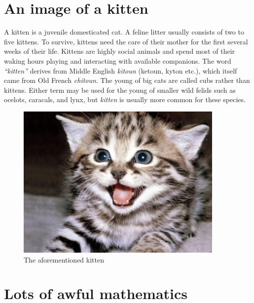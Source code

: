 \chapter{An image of a kitten}

A kitten is a juvenile domesticated cat. A feline litter usually consists of two to five kittens. To survive, kittens need the care of their mother for the first several weeks of their life. Kittens are highly social animals and spend most of their waking hours playing and interacting with available companions. The word \emph{``kitten''} derives from Middle English \emph{kitoun} (ketoun, kyton etc.), which itself came from Old French \emph{chitoun}. The young of big cats are called cubs rather than kittens. Either term may be used for the young of smaller wild felids such as ocelots, caracals, and lynx, but \emph{kitten} is usually more common for these species.

\begin{figure}[b!] 
   \centering
   \includegraphics[width=0.9\textwidth]{kitten.jpg} 
   \caption{The aforementioned kitten}
   \label{fig:kitten}
\end{figure}

\chapter{Lots of awful mathematics}


